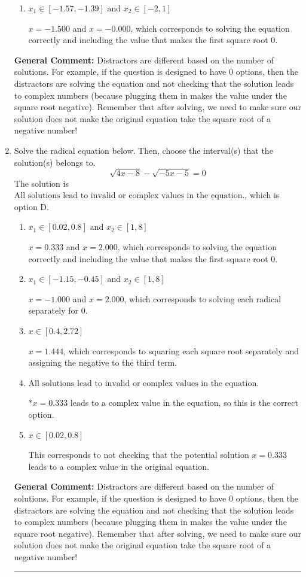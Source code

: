 \documentclass{extbook}[14pt]
\newcommand{\litem}[1]{\item #1

\rule{\textwidth}{0.4pt}}
\begin{document}
\begin{enumerate}
{\begin{enumerate}[label=\Alph*.]
$x = -1.500$ and $x = 2.250$, which corresponds to solving each radical separately for 0.
\item \( x_1 \in [-1.57, -1.39] \text{ and } x_2 \in [-2,1] \)

$x = -1.500$ and $x = -0.000$, which corresponds to solving the equation correctly and including the value that makes the first square root 0.
\end{enumerate}

\textbf{General Comment:} Distractors are different based on the number of solutions. For example, if the question is designed to have 0 options, then the distractors are solving the equation and not checking that the solution leads to complex numbers (because plugging them in makes the value under the square root negative). Remember that after solving, we need to make sure our solution does not make the original equation take the square root of a negative number!
}
\litem{
Solve the radical equation below. Then, choose the interval(s) that the solution(s) belongs to.
\[ \sqrt{4 x - 8} - \sqrt{-5 x - 5} = 0 \]The solution is \( \text{All solutions lead to invalid or complex values in the equation.} \), which is option D.\begin{enumerate}[label=\Alph*.]
\item \( x_1 \in [0.02, 0.8] \text{ and } x_2 \in [1,8] \)

$x = 0.333$ and $x = 2.000$, which corresponds to solving the equation correctly and including the value that makes the first square root 0.
\item \( x_1 \in [-1.15, -0.45] \text{ and } x_2 \in [1,8] \)

$x = -1.000$ and $x = 2.000$, which corresponds to solving each radical separately for 0.
\item \( x \in [0.4,2.72] \)

$x = 1.444$, which corresponds to squaring each square root separately and assigning the negative to the third term.
\item \( \text{All solutions lead to invalid or complex values in the equation.} \)

*$x = 0.333$ leads to a complex value in the equation, so this is the correct option.
\item \( x \in [0.02,0.8] \)

This corresponds to not checking that the potential solution $x = 0.333$ leads to a complex value in the original equation.
\end{enumerate}

\textbf{General Comment:} Distractors are different based on the number of solutions. For example, if the question is designed to have 0 options, then the distractors are solving the equation and not checking that the solution leads to complex numbers (because plugging them in makes the value under the square root negative). Remember that after solving, we need to make sure our solution does not make the original equation take the square root of a negative number!
}
\end{enumerate}
\end{document}
